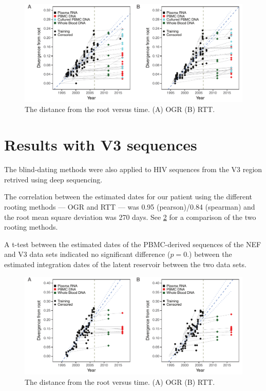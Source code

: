 \documentclass[12pt,onecolumn,twoside]{pnas-new}
\begin{document}
\begin{figure}
\includegraphics{nefdistvtime}
\caption{The distance from the root versus time.
(A) OGR (B) RTT.}
\label{fig:nefdistvtime}
\end{figure}

\section*{Results with V3 sequences}
The blind-dating methods were also applied to HIV sequences from the V3 region retrived using deep sequencing.

The correlation between the estimated dates for our patient using the different rooting methods --- OGR and RTT --- was 0.95 (pearson)/0.84 (spearman) and the root mean square deviation was 270 days.
See \cref{fig:v3distvtime} for a comparison of the two rooting methods.

A t-test between the estimated dates of the PBMC-derived sequences of the NEF and V3 data sets indicated no significant difference ($p=0.$) between the estimated integration dates of the latent reservoir between the two data sets.

\begin{figure}
\includegraphics{v3distvtime}
\caption{The distance from the root versus time.
(A) OGR (B) RTT.}
\label{fig:v3distvtime}
\end{figure}
\end{document}
